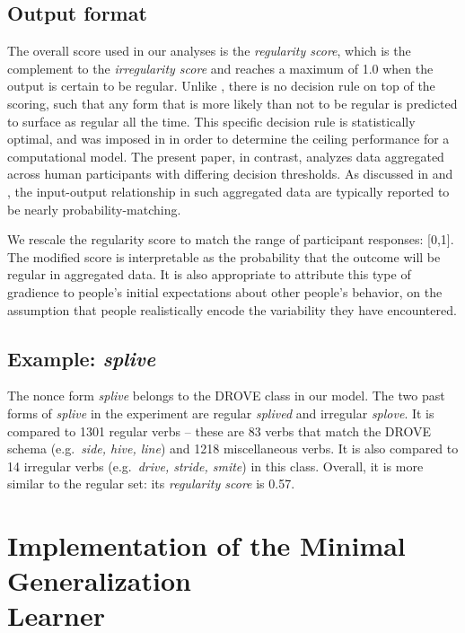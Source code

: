 \documentclass[12pt]{article}
\begin{document}
\subsection{Output format \label{gcm_scale}}

The overall score used in our analyses is the {\em regularity score}, which is the complement to the {\em irregularity score} and reaches a maximum of 1.0 when the output is certain to be regular. Unlike \cite{dawdy2014learnability}, there is no decision rule on top of the scoring, such that any form that is more likely than not to be regular is predicted to surface as regular all the time. This specific decision rule is statistically optimal, and was imposed in \cite{dawdy2014learnability} in order to determine the ceiling performance for a computational model. The present paper, in contrast, analyzes data aggregated across human participants with differing decision thresholds. As discussed in \cite{schumacher2014reconciling} and \cite{schumacher2017prior}, the input-output relationship in such aggregated data are typically reported to be nearly probability-matching. 

We rescale the regularity score to match the range of participant responses: [0,1]. The modified score is interpretable as the probability that the outcome will be regular in aggregated data. It is also appropriate to attribute this type of gradience to people's initial expectations about other people's behavior, on the assumption that people realistically encode the variability they have encountered.

\subsection{Example: {\em splive}}


The nonce form {\em splive} belongs to the DROVE class in our model. The two past forms of {\em splive} in the experiment are regular {\em splived} and irregular {\em splove}. It is compared to 1301 regular verbs -- these are 83 verbs that match the DROVE schema (e.g.\ {\em side, hive, line}) and 1218 miscellaneous verbs. It is also compared to 14 irregular verbs (e.g.\ {\em drive, stride, smite}) in this class. Overall, it is more similar to the regular set: its {\em regularity score} is 0.57.   

\section{Implementation of the Minimal Generalization \\ Learner}\label{appendixmgl}
\end{document}
